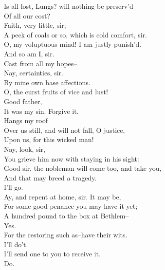 \documentclass{memoir}
\begin{document}
\begin{drama*}
\mammonspeaks  Is all lost, Lungs? will nothing be preserv'd\\
 Of all our cost?\\
\facespeaks {} Faith, very little, sir;\\
 A peck of coals or so, which is cold comfort, sir.\\
\mammonspeaks  O, my voluptuous mind! I am justly punish'd.\\
\facespeaks  And so am I, sir.\\
\mammonspeaks {} Cast from all my hopes--\\
\facespeaks  Nay, certainties, sir.\\
\mammonspeaks {} By mine own base affections.\\
\subtlespeaks {}
 O, the curst fruits of vice and lust!\\
\mammonspeaks {} Good father,\\
 It was my sin. Forgive it.\\
\subtlespeaks {} Hangs my roof\\
 Over us still, and will not fall, O justice,\\
 Upon us, for this wicked man!\\
\facespeaks {} Nay, look, sir,\\
 You grieve him now with staying in his sight:\\
 Good sir, the nobleman will come too, and take you,\\
 And that may breed a tragedy.\\
\mammonspeaks {} I'll go.\\
\facespeaks  Ay, and repent at home, sir. It may be,\\
 For some good penance you may have it yet;\\
 A hundred pound to the box at Bethlem--\\
\mammonspeaks  Yes.\\
\facespeaks {} For the restoring such as--have their wits.\\
\mammonspeaks  I'll do't.\\
\facespeaks {} I'll send one to you to receive it.\\
\mammonspeaks  Do.\\

\end{drama*}
\end{document}
